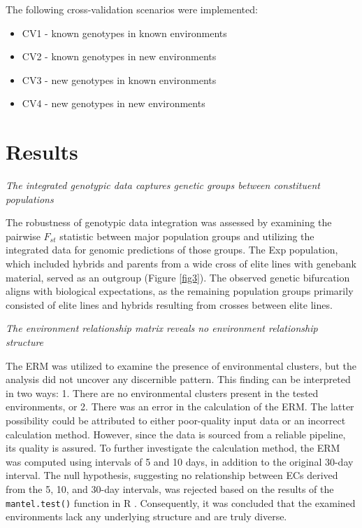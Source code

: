 \documentclass[english, biblatex]{lni}
\begin{document}
The following cross-validation scenarios were implemented:

\begin{itemize}
    \item CV1 - known genotypes in known environments
    \item CV2 - known genotypes in new environments
    \item CV3 - new genotypes in known environments
    \item CV4 - new genotypes in new environments
\end{itemize}

\section{Results}
\textit{The integrated genotypic data captures genetic groups between constituent populations} 

The robustness of genotypic data integration was assessed by examining the pairwise $F_{st}$ statistic between major population groups and utilizing the integrated data for genomic predictions \cite{ref?} of those groups. The Exp population, which included hybrids and parents from a wide cross of elite lines with genebank material, served as an outgroup (Figure \ref{fig3}). The observed genetic bifurcation aligns with biological expectations, as the remaining population groups primarily consisted of elite lines and hybrids resulting from crosses between elite lines.

\textit{The environment relationship matrix reveals no environment relationship structure} 

The ERM was utilized to examine the presence of environmental clusters, but the analysis did not uncover any discernible pattern. This finding can be interpreted in two ways: 1. There are no environmental clusters present in the tested environments, or 2. There was an error in the calculation of the ERM. The latter possibility could be attributed to either poor-quality input data or an incorrect calculation method. However, since the data is sourced from a reliable pipeline, its quality is assured. To further investigate the calculation method, the ERM was computed using intervals of 5 and 10 days, in addition to the original 30-day interval. The null hypothesis, suggesting no relationship between ECs derived from the 5, 10, and 30-day intervals, was rejected based on the results of the \texttt{mantel.test()} function in R \cite{paradis_ape_2019}. Consequently, it was concluded that the examined environments lack any underlying structure and are truly diverse.
\end{document}
